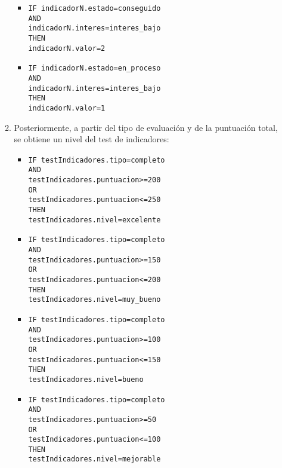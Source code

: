 \begin{enumerate}
\begin{enumerate}
\begin{itemize}
            \item \texttt{IF indicadorN.estado=conseguido \\AND\\ indicadorN.interes=interes\_bajo \\THEN\\ indicadorN.valor=2}
            \item \texttt{IF indicadorN.estado=en\_proceso \\AND\\ indicadorN.interes=interes\_bajo \\THEN\\ indicadorN.valor=1}
        \end{itemize}
        \item Posteriormente, a partir del tipo de evaluación y de la puntuación total, se obtiene un nivel del test de indicadores:
        \begin{itemize}
            \item \texttt{IF testIndicadores.tipo=completo \\AND\\ testIndicadores.puntuacion>=200 \\OR\\ testIndicadores.puntuacion<=250 \\THEN\\ testIndicadores.nivel=excelente}
            \item \texttt{IF testIndicadores.tipo=completo \\AND\\ testIndicadores.puntuacion>=150 \\OR\\ testIndicadores.puntuacion<=200 \\THEN\\ testIndicadores.nivel=muy\_bueno}
            \item \texttt{IF testIndicadores.tipo=completo \\AND\\ testIndicadores.puntuacion>=100 \\OR\\ testIndicadores.puntuacion<=150 \\THEN\\ testIndicadores.nivel=bueno}
            \item \texttt{IF testIndicadores.tipo=completo \\AND\\ testIndicadores.puntuacion>=50 \\OR\\ testIndicadores.puntuacion<=100 \\THEN\\ testIndicadores.nivel=mejorable}

\end{itemize}
\end{enumerate}
\end{enumerate}
